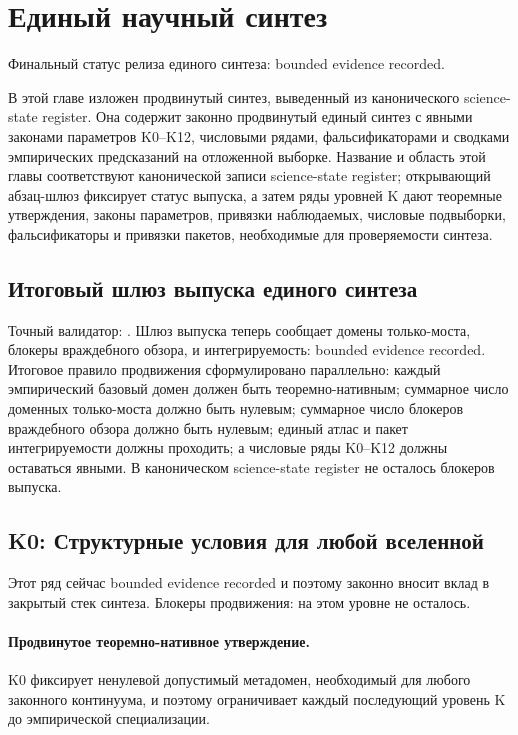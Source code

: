 \section{Единый научный синтез}
\label{sec:oc-core-1-3-unified-synthesis}
Финальный статус релиза единого синтеза: bounded evidence recorded.

В этой главе изложен продвинутый синтез, выведенный из канонического science-state register. Она содержит законно продвинутый единый синтез с явными законами параметров K0--K12, числовыми рядами, фальсификаторами и сводками эмпирических предсказаний на отложенной выборке.
Название и область этой главы соответствуют канонической записи science-state register; открывающий абзац-шлюз фиксирует статус выпуска, а затем ряды уровней K дают теоремные утверждения, законы параметров, привязки наблюдаемых, числовые подвыборки, фальсификаторы и привязки пакетов, необходимые для проверяемости синтеза.

\subsection{Итоговый шлюз выпуска единого синтеза}
Точный валидатор: .
Шлюз выпуска теперь сообщает  домены только-моста,  блокеры враждебного обзора, и интегрируемость: bounded evidence recorded.
Итоговое правило продвижения сформулировано параллельно: каждый эмпирический базовый домен должен быть теоремно-нативным; суммарное число доменных только-моста должно быть нулевым; суммарное число блокеров враждебного обзора должно быть нулевым; единый атлас и пакет интегрируемости должны проходить; а числовые ряды K0--K12 должны оставаться явными.
В каноническом science-state register не осталось блокеров выпуска.

\subsection{K0: Структурные условия для любой вселенной}
\label{sec:oc-core-1-3-synthesis-k0}
Этот ряд сейчас bounded evidence recorded и поэтому законно вносит вклад в закрытый стек синтеза.
Блокеры продвижения: на этом уровне не осталось.

\paragraph{Продвинутое теоремно-нативное утверждение.}
K0 фиксирует ненулевой допустимый метадомен, необходимый для любого законного континуума, и поэтому ограничивает каждый последующий уровень K до эмпирической специализации.

